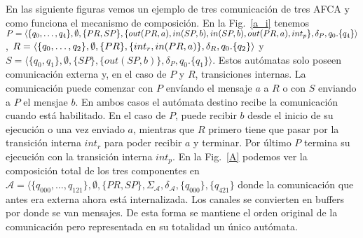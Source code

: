 \begin{ejemplo}
%

En las siguiente figuras vemos un ejemplo de tres comunicación de tres AFCA y como funciona el mecanismo de composición. En la Fig.~\ref{a_i} tenemos $P = \langle \{q_0,\ldots,q_4\}, \emptyset, \{PR,SP\}, \\ \{out(PR,a),in(SP,b),in(SP,b),out(PR,a),int_p\}, \delta_P,q_0. \{q_4\} \rangle$, $R = \langle \{q_0,\ldots,q_2\}, \emptyset, \{PR\}, \\ \{int_r,in(PR,a)\}, \delta_R,q_0. \{q_2\} \rangle$ y $S = \langle \{q_0,q_1\}, \emptyset, \{SP\}, \{out(SP,b)\}, \delta_P,q_0. \{q_1\} \rangle$. Estos autómatas solo poseen comunicación externa y, en el caso de $P$ y $R$, transiciones internas. La comunicación puede comenzar con $P$ envíando el mensaje $a$ a $R$ o con $S$ enviando a $P$ el mensjae $b$. En ambos casos el autómata destino recibe la comunicación cuando está habilitado. En el caso de $P$, puede recibir $b$ desde el inicio de su ejecución o una vez enviado $a$, mientras que $R$ primero tiene que pasar por la transición interna $int_r$ para poder recibir $a$ y terminar. Por último $P$ termina su ejecución con la transición interna $int_p$. En la Fig.~\ref{A} podemos ver la composición total de los tres componentes en $\mathcal{A}= \langle \{q_{000},\ldots,q_{121}\}, \emptyset, \{PR,SP\}, \Sigma_{\mathcal{A}}, \delta_{\mathcal{A}}, \{q_{000}\}, \{q_{421}\}$ donde la comunicación que antes era externa ahora está internalizada. Los canales se convierten en buffers por donde se van mensajes. De esta forma se mantiene el orden original de la comunicación pero representada en su totalidad un único autómata.


\end{ejemplo}

